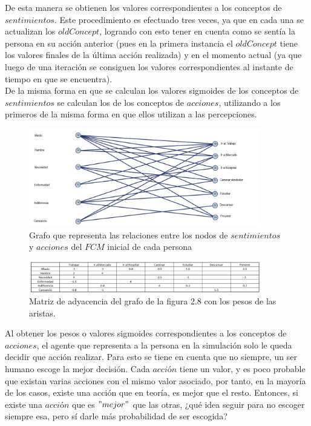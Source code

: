 De esta manera se obtienen los valores correspondientes a los conceptos de $sentimientos$. Este procedimiento
es efectuado tres veces, ya que en cada una se actualizan los $oldConcept$, logrando con esto tener en 
cuenta como se sentía la persona en su acción anterior (pues en la primera instancia el $oldConcept$
tiene los valores finales de la última acción realizada) y en el momento actual (ya que luego de una iteración
se consiguen los valores correspondientes al instante de tiempo en que se encuentra).\\

De la misma forma en que se calculan los valores sigmoides de los conceptos de $sentimientos$ se 
calculan los de los conceptos de $acciones$, utilizando a los primeros de la misma forma en que ellos
utilizan a las percepciones.\\
\begin{figure}[htb]
    \centering
    \includegraphics[width=0.9\textwidth]{Graphics/Grafo_Sent-Acciones.png}
    \caption{Grafo que representa las relaciones entre los nodos de $sentimientos$ y $acciones$ del $FCM$ inicial de cada persona}
\end{figure}

\begin{figure}[htb]
    \centering
    \includegraphics[width=0.9\textwidth]{Graphics/Pesos_aristas_Sent_Acc.png}
    \caption{Matriz de adyacencia del grafo de la figura 2.8 con los pesos de las aristas.}
\end{figure}

Al obtener los pesos o valores sigmoides correspondientes a los conceptos de $acciones$, el agente que 
representa a la persona en la simulación solo le queda decidir que acción realizar. Para esto se tiene en 
cuenta que no siempre, un ser humano escoge la mejor decisión. Cada $acci$ó$n$ tiene un valor, y es poco
probable que existan varias acciones con el mismo valor asociado, por tanto, en la mayoría de los casos,
existe una acción que en teoría, es mejor que el resto. Entonces, si existe una $acci$ó$n$ que es $"mejor"$
que las otras, ¿qué idea seguir para no escoger siempre esa, pero sí darle más probabilidad de ser escogida?\\


